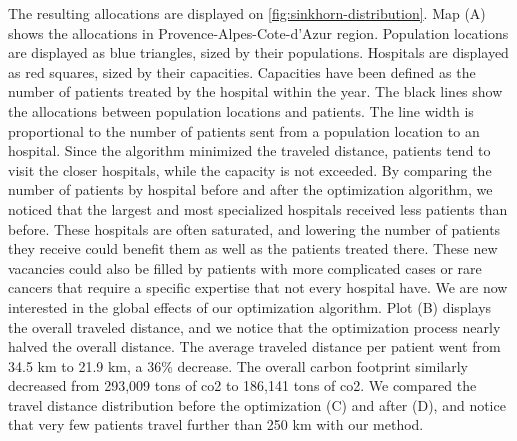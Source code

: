 The resulting allocations are displayed on \cref{fig:sinkhorn-distribution}. Map
(A) shows the allocations in Provence-Alpes-Cote-d'Azur region. Population
locations are displayed as blue triangles, sized by their populations. Hospitals
are displayed as red squares, sized by their capacities. Capacities have been
defined as the number of patients treated by the hospital within the year. The
black lines show the allocations between population locations and patients. The
line width is proportional to the number of patients sent from a population
location to an hospital. Since the algorithm minimized the traveled distance,
patients tend to visit the closer hospitals, while the capacity is not exceeded.
By comparing the number of patients by hospital before and after the
optimization algorithm, we noticed that the largest and most specialized
hospitals received less patients than before. These hospitals are often
saturated, and lowering the number of patients they receive could benefit them
as well as the patients treated there. These new vacancies could also be filled
by patients with more complicated cases or rare cancers that require a specific
expertise that not every hospital have. We are now interested in the global
effects of our optimization algorithm. Plot (B) displays the overall traveled
distance, and we notice that the optimization process nearly halved the overall
distance. The average traveled distance per patient went from 34.5 km to 21.9
km, a 36\% decrease. The overall carbon footprint similarly decreased from
293,009 tons of \ac{co2} to 186,141 tons of \ac{co2}. We compared the travel distance distribution before the optimization
(C) and after (D), and notice that very few patients travel further than 250
km with our method.

